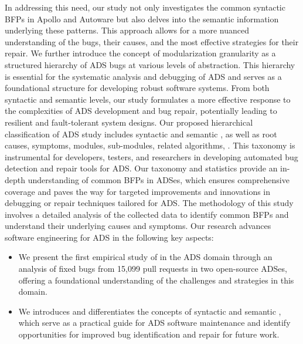 In addressing this need, our study not only investigates the common syntactic BFPs in Apollo and Autoware but also delves into the semantic information underlying these patterns. This approach allows for a more nuanced understanding of the bugs, their causes, and the most effective strategies for their repair. 
We further introduce the concept of modularization granularity as a structured hierarchy of ADS bugs at various levels of abstraction. This hierarchy is essential for the systematic analysis and debugging of ADS and serves as a foundational structure for developing robust software systems. From both syntactic and semantic levels, our study formulates a more effective response to the complexities of ADS development and bug repair, potentially leading to resilient and fault-tolerant system designs.
Our proposed hierarchical classification of ADS \bfp study includes \numsyn syntactic and \numsem semantic \bfps, as well as root causes, symptoms, modules, sub-modules, related algorithms, . This taxonomy is instrumental for developers, testers, and researchers in developing automated bug detection and repair tools for ADS.
Our taxonomy and statistics provide an in-depth understanding of common BFPs in ADSes, which ensures comprehensive coverage and paves the way for targeted improvements and innovations in debugging or repair techniques tailored for ADS.
The methodology of this study involves a detailed analysis of the collected data to identify common BFPs and understand their underlying causes and symptoms. 
Our research advances software engineering for ADS in the following key aspects:
\begin{itemize}[leftmargin=*,nosep]
\item We present the first empirical study of \bfps in the ADS domain through an analysis of \numbug fixed bugs from 15,099 pull requests in two open-source ADSes, offering a foundational understanding of the challenges and strategies in this domain. 

\item We  introduces and differentiates the concepts of syntactic and semantic \bfps, which serve as a practical guide for ADS software maintenance and identify opportunities for improved bug identification and repair for future work. 

\end{itemize}
